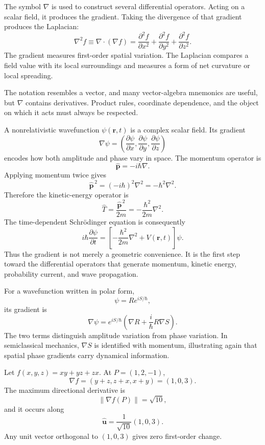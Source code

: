 The symbol $\nabla$ is used to construct several differential operators. Acting on a scalar field, it produces the gradient. Taking the divergence of that gradient produces the Laplacian:
\[
\boxed{
\nabla^2f
\equiv
\nabla\cdot(\nabla f)
=
\frac{\partial^2f}{\partial x^2}
+
\frac{\partial^2f}{\partial y^2}
+
\frac{\partial^2f}{\partial z^2}.
}
\]
The gradient measures first-order spatial variation. The Laplacian compares a field value with its local surroundings and measures a form of net curvature or local spreading.

\begin{bookinsight}
The notation resembles a vector, and many vector-algebra mnemonics are useful, but $\nabla$ contains derivatives. Product rules, coordinate dependence, and the object on which it acts must always be respected.
\end{bookinsight}


A nonrelativistic wavefunction $\psi(\mathbf r,t)$ is a complex scalar field. Its gradient
\[
\nabla\psi
=
\left(
\frac{\partial\psi}{\partial x},
\frac{\partial\psi}{\partial y},
\frac{\partial\psi}{\partial z}
\right)
\]
encodes how both amplitude and phase vary in space. The momentum operator is
\[
\boxed{\hat{\mathbf p}=-i\hbar\nabla.}
\]
Applying momentum twice gives
\[
\hat{\mathbf p}^{\,2}
=(-i\hbar)^2\nabla^2
=-\hbar^2\nabla^2.
\]
Therefore the kinetic-energy operator is
\[
\boxed{
\hat T=\frac{\hat{\mathbf p}^{\,2}}{2m}
=-\frac{\hbar^2}{2m}\nabla^2.
}
\]
The time-dependent Schr\"odinger equation is consequently
\[
\boxed{
i\hbar\frac{\partial\psi}{\partial t}
=
\left[-\frac{\hbar^2}{2m}\nabla^2+V(\mathbf r,t)\right]\psi.
}
\]
Thus the gradient is not merely a geometric convenience. It is the first step toward the differential operators that generate momentum, kinetic energy, probability current, and wave propagation.

For a wavefunction written in polar form,
\[
\psi=R e^{iS/\hbar},
\]
its gradient is
\[
\nabla\psi
=e^{iS/\hbar}
\left(\nabla R+\frac{i}{\hbar}R\nabla S\right).
\]
The two terms distinguish amplitude variation from phase variation. In semiclassical mechanics, $\nabla S$ is identified with momentum, illustrating again that spatial phase gradients carry dynamical information.


\begin{bookexample}
Let $f(x,y,z)=xy+yz+zx$. At $P=(1,2,-1)$,
\[
\nabla f=(y+z,z+x,x+y)=(1,0,3).
\]
The maximum directional derivative is
\[
\lVert\nabla f(P)\rVert=\sqrt{10},
\]
and it occurs along
\[
\hat{\mathbf u}=\frac{1}{\sqrt{10}}(1,0,3).
\]
Any unit vector orthogonal to $(1,0,3)$ gives zero first-order change.
\end{bookexample}

